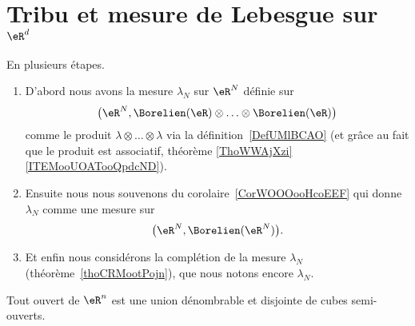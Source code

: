 \section{Tribu et mesure de Lebesgue sur \texorpdfstring{\(  \eR^d\)}{Rd}}

\begin{definition}      \label{DEFooSWJNooCSFeTF}
	En plusieurs étapes.
	\begin{enumerate}
		\item
		      D'abord nous avons la mesure \( \lambda_N\) sur \( \eR^N\) définie sur
		      \begin{equation}
			      \big( \eR^N,\Borelien(\eR)\otimes\ldots\otimes\Borelien(\eR) \big)
		      \end{equation}
		      comme le produit \( \lambda\otimes\ldots\otimes \lambda\) via la définition~\ref{DefUMlBCAO} (et grâce au fait que le produit est associatif, théorème \ref{ThoWWAjXzi}\ref{ITEMooUOATooQpdcND}).
		\item
		      Ensuite nous nous souvenons du corolaire~\ref{CorWOOOooHcoEEF} qui donne \( \lambda_N\) comme une mesure sur
		      \begin{equation}
			      \big( \eR^N,\Borelien(\eR^N) \big).
		      \end{equation}
		\item
		      Et enfin nous considérons la complétion de la mesure \( \lambda_N\) (théorème~\ref{thoCRMootPojn}), que nous notons encore \( \lambda_N\).
	\end{enumerate}
\end{definition}

\begin{proposition}     \label{PropSKXGooRFHQst}
	Tout ouvert de \( \eR^n\) est une union dénombrable et disjointe de cubes semi-ouverts.
\end{proposition}

